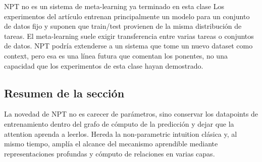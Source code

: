 \begin{warningbox}{NPT no es un sistema de meta-learning ya terminado en esta clase}
Los experimentos del artículo entrenan principalmente un modelo para un conjunto de datos fijo y suponen que train/test provienen de la misma distribución de tareas. El meta-learning suele exigir transferencia entre varias tareas o conjuntos de datos. NPT podría extenderse a un sistema que tome un nuevo dataset como context, pero esa es una línea futura que comentan los ponentes, no una capacidad que los experimentos de esta clase hayan demostrado.
\end{warningbox}


\subsection{Resumen de la sección}

La novedad de NPT no es carecer de parámetros, sino conservar los datapoints de entrenamiento dentro del grafo de cómputo de la predicción y dejar que la attention aprenda a leerlos. Hereda la non-parametric intuition clásica y, al mismo tiempo, amplía el alcance del mecanismo aprendible mediante representaciones profundas y cómputo de relaciones en varias capas.
